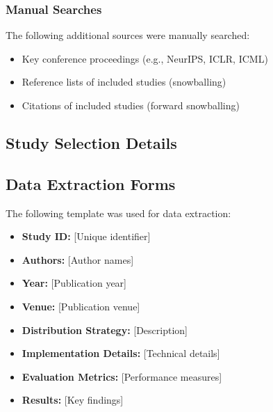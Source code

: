 \subsubsection{Manual Searches}
The following additional sources were manually searched:
\begin{itemize}
    \item Key conference proceedings (e.g., NeurIPS, ICLR, ICML)
    \item Reference lists of included studies (snowballing)
    \item Citations of included studies (forward snowballing)
\end{itemize}

\subsection{Study Selection Details}
\label{sec:study_selection}



\subsection{Data Extraction Forms}
\label{sec:data_extraction}

The following template was used for data extraction:
\begin{itemize}
    \item \textbf{Study ID:} [Unique identifier]
    \item \textbf{Authors:} [Author names]
    \item \textbf{Year:} [Publication year]
    \item \textbf{Venue:} [Publication venue]
    \item \textbf{Distribution Strategy:} [Description]
    \item \textbf{Implementation Details:} [Technical details]
    \item \textbf{Evaluation Metrics:} [Performance measures]
    \item \textbf{Results:} [Key findings]
\end{itemize}

